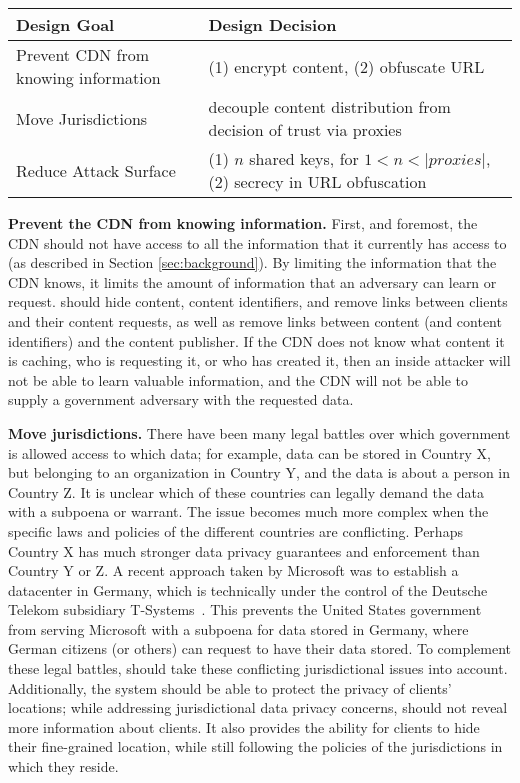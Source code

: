 \begin{table*}[h]
\centering
\begin{tabular}{| l | l |} 
 \hline
 {\bf Design Goal} & {\bf Design Decision} \\ 
 \hline\hline
 Prevent CDN from knowing information & (1) encrypt content, (2) obfuscate URL  \\ \hline
 Move Jurisdictions & decouple content distribution from decision of trust via proxies  \\ \hline
 Reduce Attack Surface & (1) $n$ shared keys, for $1 < n < |proxies|$, (2) secrecy in URL obfuscation \\ 
 \hline
\end{tabular}
\caption{Design goals and the corresponding design choices made in \system{}.}
\label{tab:design_goals}
\end{table*}

{\bf Prevent the CDN from knowing information.} First, and foremost, the CDN 
should not have access to all the information that it currently has access to (as described 
in Section \ref{sec:background}).  By limiting the information that the CDN knows, it limits 
the amount of information that an adversary can learn or request.  \system{} should hide 
content, content identifiers, and remove links between clients and their content requests, as well 
as remove links between content (and content identifiers) and the content publisher.  If the CDN 
does not know what content it is caching, who is requesting it, or who has created it, then an 
inside attacker will not be able to learn valuable information, and the CDN will not be able to supply 
a government adversary with the requested data.

{\bf Move jurisdictions.} There have been many legal battles over which government is allowed access 
to which data; for example, data can be stored in Country X, but belonging to an organization in Country Y, and 
the data is about a person in Country Z.  It is unclear which of these countries can legally demand 
the data with a subpoena or warrant.  The issue becomes much more complex when the specific laws 
and policies of the different countries are conflicting.  Perhaps Country X has much stronger data privacy 
guarantees and enforcement than Country Y or Z.  A recent approach taken by Microsoft was to establish 
a datacenter in Germany, which is technically under the control of the Deutsche Telekom subsidiary 
T-Systems~\cite{microsoft_germany}.  This prevents the United States government from serving Microsoft with a subpoena 
for data stored in Germany, where German citizens (or others) can request to have their data stored.
  To complement these legal battles, \system{} should take 
these conflicting jurisdictional issues into account.  Additionally, the system should be able to protect 
the privacy of clients' locations; while addressing jurisdictional data privacy concerns, \system{} 
should not reveal more information about clients.  It also provides the ability for clients 
to hide their fine-grained location, while still following the policies of the jurisdictions in which 
they reside.

